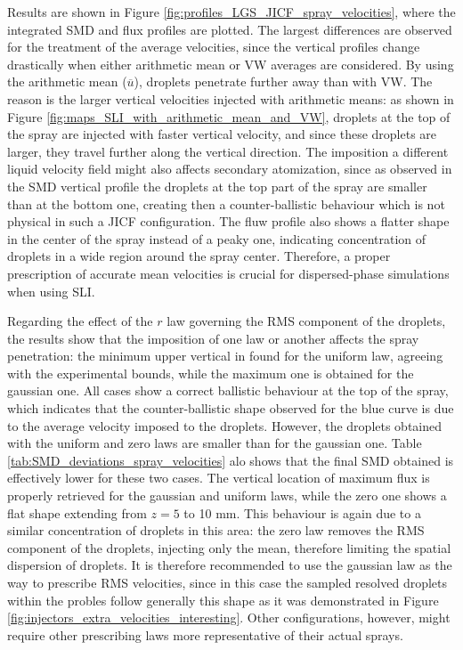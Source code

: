Results are shown in Figure \ref{fig:profiles_LGS_JICF_spray_velocities}, where the integrated SMD and flux profiles are plotted. The largest differences are observed for the treatment of the average velocities, since the vertical profiles change drastically when either arithmetic mean or VW averages are considered. By using the arithmetic mean ($\overline{u}$), droplets penetrate further away than with VW. The reason is the larger vertical velocities injected with arithmetic means: as shown in Figure \ref{fig:maps_SLI_with_arithmetic_mean_and_VW}, droplets at the top of the spray are injected with faster vertical velocity, and since these droplets are larger, they travel further along the vertical direction. The imposition a different liquid velocity field might also affects secondary atomization, since as observed in the SMD vertical profile the droplets at the top part of the spray are smaller than at the bottom one, creating then a counter-ballistic behaviour which is not physical in such a JICF configuration. The fluw profile also shows a flatter shape in the center of the spray instead of a peaky one, indicating concentration of droplets in a wide region around the spray center. Therefore, a proper prescription of accurate mean velocities is crucial for dispersed-phase simulations when using SLI. 

Regarding the effect of the $r$ law governing the RMS component of the droplets, the results show that the imposition of one law or another affects the spray penetration: the minimum upper vertical in found for the uniform law, agreeing with the experimental bounds, while the maximum one is obtained for the gaussian one. All cases show a correct ballistic behaviour at the top of the spray, which indicates that the counter-ballistic shape observed for the blue curve is due to the average velocity imposed to the droplets. However, the droplets obtained with the uniform and zero laws are smaller than for the gaussian one. Table \ref{tab:SMD_deviations_spray_velocities}  alo shows that the final SMD obtained is effectively lower for these two cases. The vertical location of maximum flux is properly retrieved for the gaussian and uniform laws, while the zero one shows a flat shape extending from $z = 5$ to 10 mm. This behaviour is again due to a similar concentration of droplets in this area: the zero law removes the RMS component of the droplets, injecting only the mean, therefore limiting the spatial dispersion of droplets. It is therefore recommended to use the gaussian law as the way to prescribe RMS velocities, since in this case the sampled resolved droplets within the probles follow generally this shape as it was demonstrated in Figure \ref{fig:injectors_extra_velocities_interesting}. Other configurations, however, might require other prescribing laws more representative of their actual sprays.


